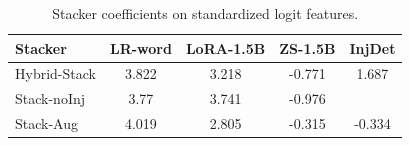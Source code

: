 \begin{table}[t]
\centering
\caption{Stacker coefficients on standardized logit features.}
\label{tab:stack}
\footnotesize
\begin{tabular}{lcccc}
\toprule
\textbf{Stacker} & \textbf{LR-word} & \textbf{LoRA-1.5B} & \textbf{ZS-1.5B} & \textbf{InjDet} \\
\midrule
Hybrid-Stack & 3.822 & 3.218 & -0.771 & 1.687 \\
Stack-noInj & 3.77 & 3.741 & -0.976 &  \\
Stack-Aug & 4.019 & 2.805 & -0.315 & -0.334 \\
\bottomrule
\end{tabular}
\end{table}